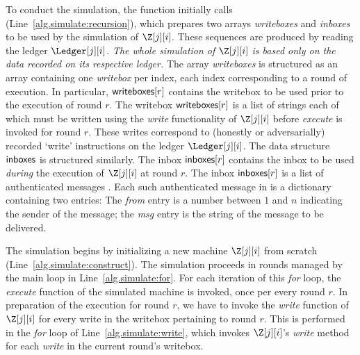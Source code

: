 To conduct the simulation, the \simulate function initially calls
\prepareSimulationInputs (Line~\ref{alg.simulate:recursion}),
which prepares two arrays \emph{writeboxes}
and \emph{inboxes} to be used by the simulation of $\Z[j][i]$.
These sequences are produced by reading the ledger $\Ledger[j][i]$.
\emph{The whole simulation of $\Z[j][i]$ is based only on the data
recorded on its respective ledger.}
The array \emph{writeboxes} is structured as an array containing
one \emph{writebox} per index, each index corresponding to a
round of execution. In particular, $\textsf{writeboxes}[r]$ contains the
writebox to be used prior to the execution of round $r$.
The writebox $\textsf{writeboxes}[r]$ is a list of strings each of which must be
written using the \emph{write} functionality of $\Z[j][i]$
before \emph{execute} is invoked for round $r$.
These writes correspond to (honestly or adversarially) recorded
`write' instructions on the ledger $\Ledger[j][i]$.
The data structure $\textsf{inboxes}$ is structured similarly.
The inbox $\textsf{inboxes}[r]$ contains the inbox to be used \emph{during}
the execution of $\Z[j][i]$ at round $r$. The inbox $\textsf{inboxes}[r]$
is a list of authenticated messages \netins. Each such authenticated
message \netin in \netins is a dictionary containing two entries:
The \emph{from} entry is a number between $1$ and $n$ indicating the
sender of the message; the \emph{msg} entry is the string of
the message to be delivered.

The simulation begins by initializing a new machine $\Z[j][i]$
from scratch (Line~\ref{alg.simulate:construct}). The simulation
proceeds in rounds managed by the main loop in
Line~\ref{alg.simulate:for}. For each iteration of this \emph{for}
loop, the \emph{execute} function of the simulated machine
is invoked, once per every round $r$. In preparation of the
execution for round $r$, we have to invoke the \emph{write}
function of $\Z[j][i]$ for every write in the writebox pertaining
to round $r$. This is performed in the \emph{for} loop of
Line~\ref{alg.simulate:write}, which invokes $\Z[j][i]$'s
\emph{write} method for each \emph{write} in the current
round's writebox.

